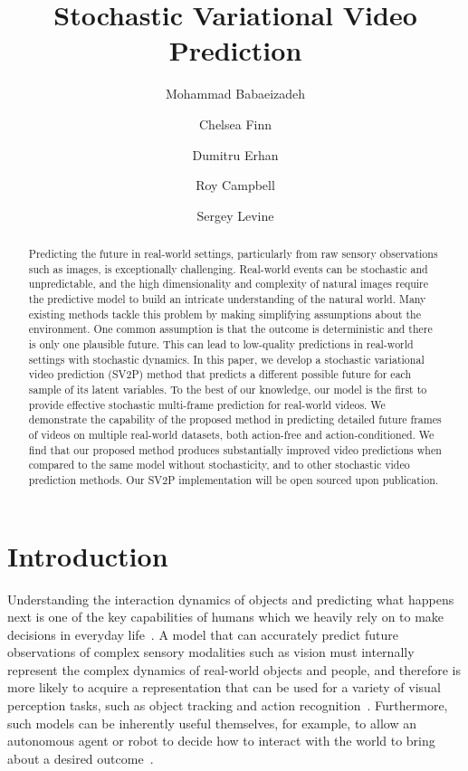 \documentclass{article} \usepackage{iclr2018_conference,times}
\title{Stochastic Variational Video Prediction}
\author[1]{Mohammad Babaeizadeh}
\author[2]{Chelsea Finn}
\author[3]{Dumitru Erhan}
\author[1]{Roy Campbell}
\author[2,3]{Sergey Levine}
\affil[1]{University of Illinois at Urbana-Champaign}
\affil[2]{University of California, Berkeley}
\affil[3]{Google Brain}
\affil[ ]{}
\affil[ ]{\texttt{\footnotesize{mb2@uiuc.edu, cbfinn@eecs.berkeley.edu, dumitru@google.com, rhc@illinois.edu, svlevine@eecs.berkeley.edu}}}
\begin{document}
\maketitle


\begin{abstract}
Predicting the future in real-world settings, particularly from raw sensory observations such as images, is exceptionally challenging. Real-world events can be stochastic and unpredictable, and the high dimensionality and complexity of natural images require the predictive model to build an intricate understanding of the natural world. Many existing methods tackle this problem by making simplifying assumptions about the environment. One common assumption is that the outcome is deterministic and there is only one plausible future. This can lead to low-quality predictions in real-world settings with stochastic dynamics. In this paper, we develop a stochastic variational video prediction (SV2P) method that predicts a different possible future for each sample of its latent variables. To the best of our knowledge, our model is the first to provide effective stochastic multi-frame prediction for real-world videos. We demonstrate the capability of the proposed method in predicting detailed future frames of videos on multiple real-world datasets, both action-free and action-conditioned. We find that our proposed method produces substantially improved video predictions when compared to the same model without stochasticity, and to other stochastic video prediction methods. Our SV2P implementation will be open sourced upon publication.
 \end{abstract}

\section{Introduction}
Understanding the interaction dynamics of objects and predicting what happens next is one of the key capabilities of humans which we heavily rely on to make decisions in everyday life~\citep{bubic2010prediction}.  A model that can accurately predict future observations of complex sensory modalities such as vision must internally represent the complex dynamics of real-world objects and people, and therefore is more likely to acquire a representation that can be used for a variety of visual perception tasks, such as object tracking and action recognition~\citep{srivastava2015unsupervised,prednet,denton2017unsupervised}.
Furthermore, such models can be inherently useful themselves, for example, to allow an autonomous agent or robot to decide how to interact with the world to bring about a desired outcome~\citep{oh2015action,finn2017deep}.
\end{document}
